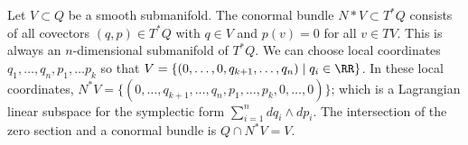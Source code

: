 

    Let $V\subset Q$ be a smooth submanifold. The conormal bundle $N*V\subset T^*Q$ consists of all covectors $(q, p)\in T^*Q$ with $q\in V$ and $p(v)=0$ for all $v\in TV$.
    This is always an $n$-dimensional submanifold of $T^*Q$.
    We can choose local coordinates $q_1, \ldots, q_n, p_1, \ldots p_k$ so that $V=\{(0, \ldots, 0, q_{k+1}, \ldots, q_n)\;|\; q_i\in \RR\}$. 
    In these local coordinates, $N^*V=\{(0, \ldots, q_{k+1}, \ldots, q_n, p_1, \ldots, p_k, 0, \ldots, 0)\}$; which is a Lagrangian linear subspace for the symplectic form $\sum_{i=1}^n dq_i \wedge dp_i$.
    The intersection of the zero section and a conormal bundle is $Q\cap N^*V=V.$

